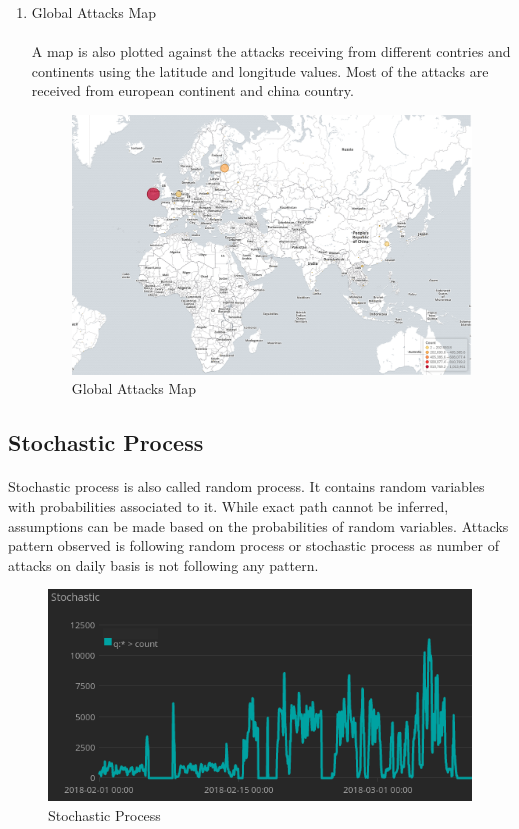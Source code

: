 \documentclass{report}
\begin{document}
\begin{enumerate}
\item Global Attacks Map
\paragraph{}
A map is also plotted against the attacks receiving from different contries and continents using the latitude and longitude values. Most of the attacks are received from european continent and china country.

\begin{figure}[H]
\centering
\caption{Global Attacks Map}
\includegraphics[scale=0.30]{Global_Attacks_Map}
\end{figure}

\end{enumerate}

\subsection{Stochastic Process}
\paragraph{}
Stochastic process is also called random process. It contains random variables with probabilities associated to it. While exact path cannot be inferred, assumptions can be made based on the probabilities of random variables. Attacks pattern observed is following random process or stochastic process as number of attacks on daily basis is not following any pattern.

\begin{figure}[H]
\centering
\caption{Stochastic Process}
\includegraphics[scale=0.7]{Stochastic_Process}
\end{figure}
\end{document}
